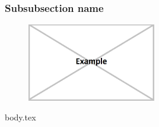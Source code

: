\subsubsection{Subsubsection name}

\blindtext

\begin{figure}[H]
    \centering
    \includegraphics[width=0.5\textwidth]{figures/example.png}
\end{figure}


\ifdefined\subsubsubsectionName
{body.tex}
\fi